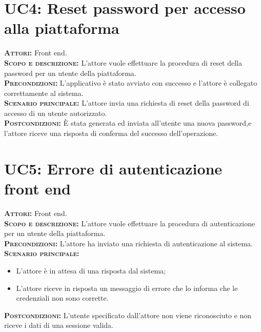\section{UC4: Reset password per accesso alla piattaforma}
\label{sec:uc4}
\textsc{\textbf{Attori:}} Front end.\\
\textsc{\textbf{Scopo e descrizione:}} L'attore vuole effettuare la procedura di reset della password per un utente della piattaforma.\\
\textsc{\textsc{\textbf{Precondizioni:}}} L'applicativo è stato avviato con successo e l'attore è collegato correttamente al sistema.\\
\textsc{\textbf{Scenario principale:}} L'attore invia una richiesta di reset della password di accesso di un utente autorizzato.\\
\textsc{\textbf{Postcondizioni:}} È stata generata ed inviata all'utente una nuova password,e l'attore riceve una risposta di conferma del successo dell'operazione.

\section{UC5: Errore di autenticazione front end}
\label{sec:UC5}
\textsc{\textbf{Attori:}} Front end.\\
\textsc{\textbf{Scopo e descrizione:}} L'attore vuole effettuare la procedura di autenticazione per un utente della piattaforma.\\
\textsc{\textsc{\textbf{Precondizioni:}}} L'attore ha inviato una richiesta di autenticazione al sistema.\\
\textsc{\textbf{Scenario principale:}} 
\begin{itemize}
    \item L'attore è in attesa di una risposta dal sistema;
    \item L'attore riceve in risposta un messaggio di errore che lo informa che le credenziali non sono corrette.
\end{itemize}
\textsc{\textbf{Postcondizioni:}} L'utente specificato dall'attore non viene riconosciuto e non riceve i dati di una sessione valida.

